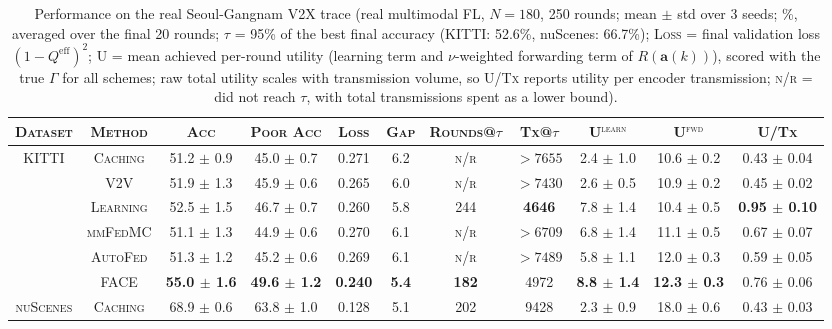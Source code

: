 \begin{table}[t]
    \centering
    \caption{Performance on the real Seoul-Gangnam V2X trace (real multimodal FL, $N{=}180$, 250 rounds; mean $\pm$ std over 3 seeds; \%, averaged over the final 20 rounds; $\tau$ = 95\% of the best final accuracy (KITTI: 52.6\%, nuScenes: 66.7\%); \textsc{Loss} = final validation loss $(1-Q^{\mathrm{eff}})^2$; \textsc{U} = mean achieved per-round utility (learning term and $\nu$-weighted forwarding term of $R(\mathbf{a}(k))$), scored with the true $\Gamma$ for all schemes; raw total utility scales with transmission volume, so \textsc{U/Tx} reports utility per encoder transmission; \textsc{n/r} = did not reach $\tau$, with total transmissions spent as a lower bound).}
    \label{tab:seoul_results}
    \renewcommand{\arraystretch}{1.15}
    \setlength{\tabcolsep}{5pt}
    \begin{tabular}{c|c|c|c|c|c|c|c|c|c|c}
        \hline
        \textsc{Dataset} & \textsc{Method} & \textsc{Acc} & \textsc{Poor Acc} & \textsc{Loss} & \textsc{Gap} & \textsc{Rounds@$\tau$} & \textsc{Tx@$\tau$} & \textsc{U$^{\mathrm{learn}}$} & \textsc{U$^{\mathrm{fwd}}$} & \textsc{U/Tx} \\
        \hline
        \multirow{6}{*}{\textsc{KITTI}}
        & \textsc{Caching} & 51.2 $\pm$ 0.9 & 45.0 $\pm$ 0.7 & 0.271 & 6.2 & \textsc{n/r} & $>7655$ & 2.4 $\pm$ 1.0 & 10.6 $\pm$ 0.2 & 0.43 $\pm$ 0.04 \\
        & \textsc{V2V} & 51.9 $\pm$ 1.3 & 45.9 $\pm$ 0.6 & 0.265 & 6.0 & \textsc{n/r} & $>7430$ & 2.6 $\pm$ 0.5 & 10.9 $\pm$ 0.2 & 0.45 $\pm$ 0.02 \\
        & \textsc{Learning} & 52.5 $\pm$ 1.5 & 46.7 $\pm$ 0.7 & 0.260 & 5.8 & 244 & \textbf{4646} & 7.8 $\pm$ 1.4 & 10.4 $\pm$ 0.5 & \textbf{0.95 $\pm$ 0.10} \\
        \cline{2-11}
        & \textsc{mmFedMC} & 51.1 $\pm$ 1.3 & 44.9 $\pm$ 0.6 & 0.270 & 6.1 & \textsc{n/r} & $>6709$ & 6.8 $\pm$ 1.4 & 11.1 $\pm$ 0.5 & 0.67 $\pm$ 0.07 \\
        & \textsc{AutoFed} & 51.3 $\pm$ 1.2 & 45.2 $\pm$ 0.6 & 0.269 & 6.1 & \textsc{n/r} & $>7489$ & 5.8 $\pm$ 1.1 & 12.0 $\pm$ 0.3 & 0.59 $\pm$ 0.05 \\
        \cline{2-11}
        & \textsc{FACE} & \textbf{55.0 $\pm$ 1.6} & \textbf{49.6 $\pm$ 1.2} & \textbf{0.240} & \textbf{5.4} & \textbf{182} & 4972 & \textbf{8.8 $\pm$ 1.4} & \textbf{12.3 $\pm$ 0.3} & 0.76 $\pm$ 0.06 \\
        \hline
        \multirow{6}{*}{\textsc{nuScenes}}
        & \textsc{Caching} & 68.9 $\pm$ 0.6 & 63.8 $\pm$ 1.0 & 0.128 & 5.1 & 202 & 9428 & 2.3 $\pm$ 0.9 & 18.0 $\pm$ 0.6 & 0.43 $\pm$ 0.03 \\

\end{tabular}
\end{table}

